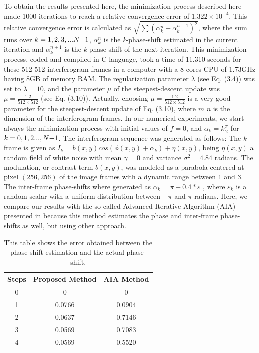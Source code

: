 To obtain the results presented here, the minimization process described
here made 1000 iterations to reach a relative convergence error of
$1.322\times10^{-4}$. This relative convergence error is calculated
as $\sqrt{\sum(\alpha_{k}^{n}-\alpha_{k}^{n+1})^{2}}$, where the
sum runs over $k=1,2,3,...N\text{\textminus}1$, $\alpha_{k}^{n}$
is the \emph{k}-phase-shift estimated in the current iteration and
$\alpha_{k}^{n+1}$ is the \emph{k}-phase-shift of the next iteration.
This minimization process, coded and compiled in C-language, took
a time of 11.310 seconds for these 512 \texttimes{} 512 interferogram
frames in a computer with a 8-cores CPU of 1.73GHz having 8GB of memory
RAM. The regularization parameter $\lambda$ (see Eq. (3.4)) was set
to $\lambda=10$, and the parameter $\mu$ of the steepest-descent
update was $\mu=\frac{1.2}{512\times512}$ (see Eq. (3.10)). Actually, choosing
$\mu=\frac{1.2}{512\times512}$ is a very good parameter for the steepest-descent
update of Eq. (3.10), where $m$ \texttimes{} $n$ is the dimension
of the interferogram frames. In our numerical experiments, we start
always the minimization process with initial values of $f=0$, and
$\alpha_{k}=k\frac{\pi}{2}$ for $k=0,1,2...,N\text{\textminus}1$.
The interferogram sequence was generated as follows: The \emph{k}-frame
is given as $I_{k}=b(x,y)cos(\phi(x,y)+\alpha_{k})+\eta(x,y)$, being
$\eta(x,y)$ a random field of white noise with mean $\gamma=0$ and
variance $\sigma^{2}=4.84$ radians. The modulation, or contrast term
$b(x,y)$, was modeled as a parabola centered at pixel $(256,256)$
of the image frames with a dynamic range between 1 and 3. The inter-frame
phase-shifts where generated as $\alpha_{k}=\pi+0.4*\varepsilon$
, where $\varepsilon_{k}$ is a random scalar with a uniform distribution
between $-\pi$ and $\pi$ radians. Here, we compare our results with
the so called Advanced Iterative Algorithm (AIA) presented in
\cite{Wang:04} because this method estimates the phase and inter-frame
phase-shifts as well, but using other approach.
\begin{table}
\begin{centering}
\begin{tabular}{|c|c|c|}
\hline 
Steps & Proposed Method & AIA Method\tabularnewline
\hline 
\hline 
0 & 0 & 0\tabularnewline
\hline 
1 & 0.0766 & 0.0904\tabularnewline
\hline 
2 & 0.0637 & 0.7146\tabularnewline
\hline 
3 & 0.0569 & 0.7083\tabularnewline
\hline 
4 & 0.0569 & 0.5520\tabularnewline
\hline 
\end{tabular}
\par\end{centering}

\caption{This table shows the error obtained between the phase-shift estimation
and the actual phase-shift.}
\end{table} \label{table:Error}
